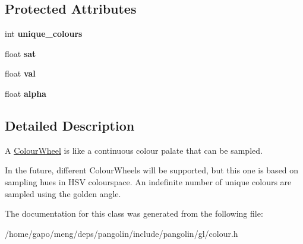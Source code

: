\subsection*{Protected Attributes}
\begin{DoxyCompactItemize}
\item 
int {\bfseries unique\+\_\+colours}\hypertarget{classpangolin_1_1_colour_wheel_a7829fb1c01b8f0f3b93ad7436892a92f}{}\label{classpangolin_1_1_colour_wheel_a7829fb1c01b8f0f3b93ad7436892a92f}

\item 
float {\bfseries sat}\hypertarget{classpangolin_1_1_colour_wheel_a4c7188ac25ce50b5b77038668c1b4b73}{}\label{classpangolin_1_1_colour_wheel_a4c7188ac25ce50b5b77038668c1b4b73}

\item 
float {\bfseries val}\hypertarget{classpangolin_1_1_colour_wheel_a2e1f6a24f74dd33eb0a67b503cd63e8a}{}\label{classpangolin_1_1_colour_wheel_a2e1f6a24f74dd33eb0a67b503cd63e8a}

\item 
float {\bfseries alpha}\hypertarget{classpangolin_1_1_colour_wheel_a73efd17611316d61e992f2095fcbbcb5}{}\label{classpangolin_1_1_colour_wheel_a73efd17611316d61e992f2095fcbbcb5}

\end{DoxyCompactItemize}


\subsection{Detailed Description}
A \hyperlink{classpangolin_1_1_colour_wheel}{Colour\+Wheel} is like a continuous colour palate that can be sampled. 

In the future, different Colour\+Wheels will be supported, but this one is based on sampling hues in H\+SV colourspace. An indefinite number of unique colours are sampled using the golden angle. 

The documentation for this class was generated from the following file\+:\begin{DoxyCompactItemize}
\item 
/home/gapo/meng/deps/pangolin/include/pangolin/gl/colour.\+h\end{DoxyCompactItemize}
